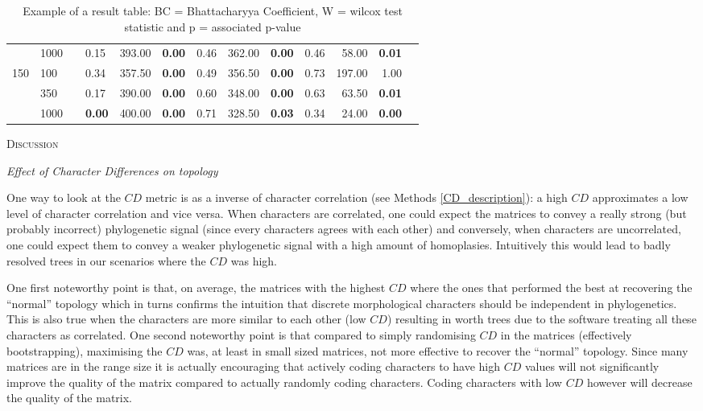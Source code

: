 \documentclass[12pt,letterpaper]{article}
\renewcommand{\section}[1]{%
\bigskip
\begin{center}
\begin{Large}
\normalfont\scshape #1
\medskip
\end{Large}
\end{center}}
\renewcommand{\subsection}[1]{%
\bigskip
\begin{center}
\begin{large}
\normalfont\itshape #1
\end{large}
\end{center}}
\begin{document}
\begin{table}[ht]
\begin{tabular}{rlllrrrrrrrrr}
   & 1000 &   & 0.15 & 393.00 & \textbf{0.00} & 0.46 & 362.00 & \textbf{0.00} & 0.46 & 58.00 & \textbf{0.01} \\ 
150 & 100 &   & 0.34 & 357.50 & \textbf{0.00} & 0.49 & 356.50 & \textbf{0.00} & 0.73 & 197.00 & 1.00 \\ 
    & 350 &   & 0.17 & 390.00 & \textbf{0.00} & 0.60 & 348.00 & \textbf{0.00} & 0.63 & 63.50 & \textbf{0.01} \\ 
    & 1000 &   & \textbf{0.00} & 400.00 & \textbf{0.00} & 0.71 & 328.50 &\textbf{0.03} & 0.34 & 24.00 & \textbf{0.00} \\ 
   \hline
\end{tabular}
\caption{Example of a result table: BC = Bhattacharyya Coefficient, W = wilcox test statistic and p = associated p-value} 
\label{LABEL}
\end{table}




\section{Discussion}


\subsection{Effect of Character Differences on topology}
One way to look at the $CD$ metric is as a inverse of character correlation (see Methods \ref{CD_description}): a high $CD$ approximates a low level of character correlation and vice versa.
When characters are correlated, one could expect the matrices to convey a really strong (but probably incorrect) phylogenetic signal (since every characters agrees with each other) and conversely, when characters are uncorrelated, one could expect them to convey a weaker phylogenetic signal with a high amount of homoplasies.
Intuitively this would lead to badly resolved trees in our scenarios where the $CD$ was high.

One first noteworthy point is that, on average, the matrices with the highest $CD$ where the ones that performed the best at recovering the ``normal'' topology which in turns confirms the intuition that discrete morphological characters should be independent in phylogenetics.
This is also true when the characters are more similar to each other (low $CD$) resulting in worth trees due to the software treating all these characters as correlated.
One second noteworthy point is that compared to simply randomising $CD$ in the matrices (effectively bootstrapping), maximising the $CD$ was, at least in small sized matrices, not more effective to recover the ``normal'' topology.
Since many matrices are in the range size \citep{guillerme2016assessment} it is actually encouraging that actively coding characters to have high $CD$ values will not significantly improve the quality of the matrix compared to actually randomly coding characters.
Coding characters with low $CD$ however will decrease the quality of the matrix.
\end{document}
